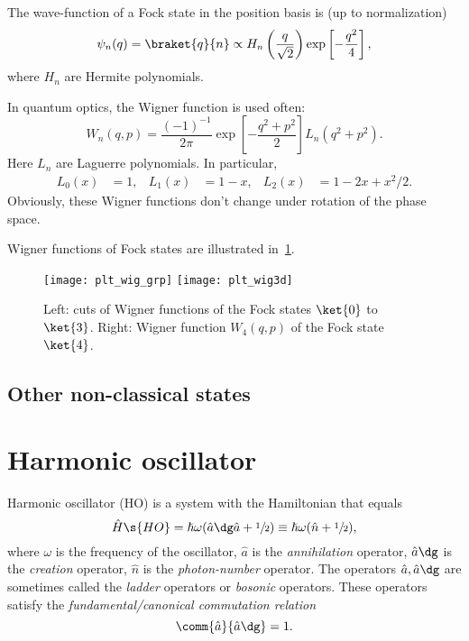 \documentclass[fontsize=9pt]{scrartcl}
\renewcommand{\hbar}{\hslash}
\begin{document}
The wave-function of a Fock state in the position basis is (up to normalization)
\begin{equation}
  \psi_n (q) = \braket{ q }{ n }
  \propto H_n \left( \frac{ q }{ \sqrt{ 2 }} \right)
  \exp\left[ - \frac{ q ^2 }{ 4 } \right],
\end{equation}
where $H_n$ are Hermite polynomials.

In quantum optics, the Wigner function is used often:
\begin{equation}
  W_n (q , p ) = \frac{ ( -1 )^{-1} }{ 2 \pi }
  \exp\left[ - \frac{ q^2 + p^2 }{ 2 } \right]
  L_n ( q^2 + p^2 ).
\end{equation}
Here $L_n$ are Laguerre polynomials.
In particular,
\begin{align}
  L_0 (x) & = 1, &
  L_1 (x) & = 1 - x, &
  L_2 (x) & = 1 - 2 x + x^2 / 2.
\end{align}
Obviously, these Wigner functions don't change under rotation of the phase space.

Wigner functions of Fock states are illustrated in~\cref{fig:plt_wig_fock}.

\begin{figure}[htb]
  \centering
  \texttt{[image: plt\_wig\_grp]}
  \texttt{[image: plt\_wig3d]}
  \caption{
    Left: cuts of Wigner functions of the Fock states $\ket{0}$ to $\ket{3}$.
    Right: Wigner function $W_4(q,p)$ of the Fock state $\ket{4}$.
  }
  \label{fig:plt_wig_fock}
\end{figure}

\subsection{Other non-classical states} %
\label{sec:other_non_classical_states}






\newpage
\appendix

\section{Harmonic oscillator} %
\label{sec:harmonic_oscillator}

Harmonic oscillator (HO) is a system with the Hamiltonian that equals
\begin{equation}
  \hat H\s{HO} = \hbar \omega ( \hat a\dg \hat a +  \sfrac 12 ) \equiv \hbar \omega ( \hat n + \sfrac 12 ),
\end{equation}
where $\omega$ is the frequency of the oscillator, $\hat a$ is the \emph{annihilation} operator, $\hat a\dg$ is the \emph{creation} operator, $\hat n$ is the \emph{photon-number} operator.
The operators $\hat a, \hat a\dg$ are sometimes called the \emph{ladder} operators or \emph{bosonic} operators.
These operators satisfy the \emph{fundamental/canonical commutation relation}
\begin{equation}
  \comm{ \hat a }{ \hat a \dg } = 1.
\end{equation}
\end{document}
